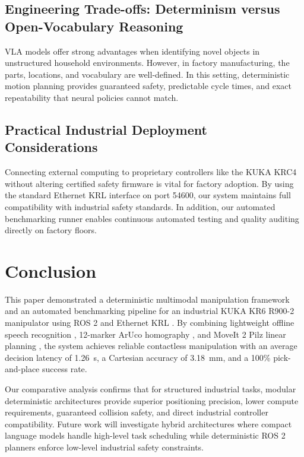 \documentclass{svproc}
\begin{document}
\subsection{Engineering Trade-offs: Determinism versus Open-Vocabulary Reasoning}
VLA models offer strong advantages when identifying novel objects in unstructured household environments. However, in factory manufacturing, the parts, locations, and vocabulary are well-defined. In this setting, deterministic motion planning provides guaranteed safety, predictable cycle times, and exact repeatability that neural policies cannot match.

\subsection{Practical Industrial Deployment Considerations}
Connecting external computing to proprietary controllers like the KUKA KRC4 without altering certified safety firmware is vital for factory adoption. By using the standard Ethernet KRL interface on port 54600, our system maintains full compatibility with industrial safety standards. In addition, our automated benchmarking runner enables continuous automated testing and quality auditing directly on factory floors.

\FloatBarrier
\section{Conclusion}
\label{sec:conclusion}

This paper demonstrated a deterministic multimodal manipulation framework and an automated benchmarking pipeline for an industrial KUKA KR6 R900-2 manipulator using ROS 2 \cite{ros2_2022} and Ethernet KRL \cite{kuka_eki2019}. By combining lightweight offline speech recognition \cite{vosk2020}, 12-marker ArUco homography \cite{aruco2014}, and MoveIt 2 \cite{moveit2014} Pilz linear planning \cite{pilz_motion2021}, the system achieves reliable contactless manipulation with an average decision latency of \SI{1.26}{\second}, a Cartesian accuracy of \SI{3.18}{\milli\meter}, and a 100\% pick-and-place success rate.

Our comparative analysis confirms that for structured industrial tasks, modular deterministic architectures provide superior positioning precision, lower compute requirements, guaranteed collision safety, and direct industrial controller compatibility. Future work will investigate hybrid architectures where compact language models handle high-level task scheduling while deterministic ROS 2 planners enforce low-level industrial safety constraints.
\end{document}
